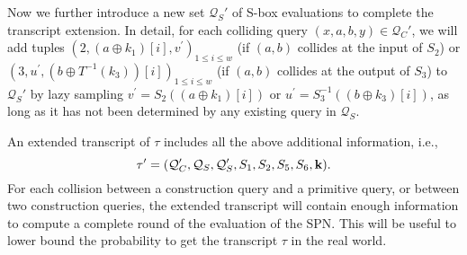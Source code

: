 %
%
Now we further introduce a new set $\mathcal{Q}_{S}'$ of S-box evaluations to complete the transcript extension. In detail, for each colliding query $(x,a,b,y)\in\mathcal{Q}_C'$, we will add tuples $\left(2, (a \oplus k_1)[i], v^{\prime}\right)_{1 \leq i \leq w}$ (if $(a, b)$ collides at the input of $S_2$) or $\left(3, u^{\prime}, (b \oplus T^{-1}(k_3))[i]\right)_{1 \leq i \leq w}$ (if $(a, b)$ collides at the output of $S_3$) to $\mathcal{Q}_{S}'$ by lazy sampling $v^{\prime}=S_2(\left(a \oplus k_1\right)[i])$ or $u^{\prime}=S_3^{-1}(\left(b \oplus k_3\right)[i])$, as long as it has not been determined by any existing query in $\mathcal{Q}_S$.


An extended transcript of $\tau$ includes all the above additional information, i.e.,
%
$$\tau'=(\mathcal{Q}_{C}',\mathcal{Q}_{S},\mathcal{Q}_{S}',S_1,S_2,S_5,S_6,\mathbf{k}).$$
%
For each collision between a construction query and a primitive query, or between two construction queries, the extended transcript will contain enough information to compute a complete round of the evaluation of the SPN. This will be useful to lower bound the probability to get the transcript $\tau$ in the real world.












